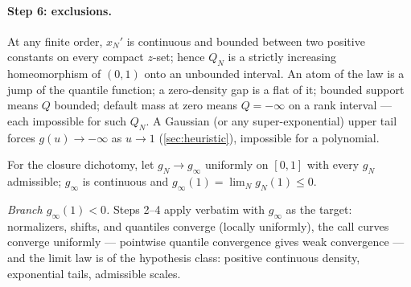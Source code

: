 \paragraph{Step 6: exclusions.}
At any finite order, $x_N'$ is continuous and bounded between two
positive constants on every compact $z$-set; hence $Q_N$ is a strictly
increasing homeomorphism of $(0,1)$ onto an unbounded interval.  An atom
of the law is a jump of the quantile function; a zero-density gap is a
flat of it; bounded support means $Q$ bounded; default mass at zero
means $Q=-\infty$ on a rank interval --- each impossible for such
$Q_N$.  A Gaussian (or any super-exponential) upper tail forces
$g(u)\to-\infty$ as $u\to1$ (\cref{sec:heuristic}), impossible for a
polynomial.

For the closure dichotomy, let $g_N\to g_\infty$ uniformly on $[0,1]$
with every $g_N$ admissible; $g_\infty$ is continuous and
$g_\infty(1)=\lim_N g_N(1)\le0$.

\emph{Branch $g_\infty(1)<0$.}  Steps 2--4 apply verbatim with
$g_\infty$ as the target: normalizers, shifts, and quantiles converge
(locally uniformly), the call curves converge uniformly --- pointwise
quantile convergence gives weak convergence --- and the limit law is of
the hypothesis class: positive continuous density, exponential tails,
admissible scales.

